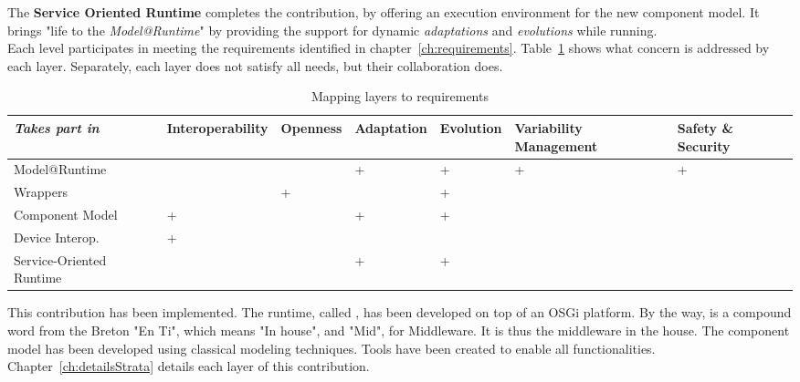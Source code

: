 The {\bf Service Oriented Runtime} completes the contribution, by offering an execution environment for the new component model. It brings "life to the {\it Model@Runtime}" by providing the support for dynamic {\it adaptations} and {\it evolutions} while running.\\

Each level participates in meeting the requirements identified in chapter~\ref{ch:requirements}. Table~\ref{table:layer_req} shows what concern is addressed by each layer. Separately, each layer does not satisfy all needs, but their collaboration does.\\

\begin{table}[h!]
\begin{tabular}{m{}| >{\centering\arraybackslash}m{}| >{\centering\arraybackslash}m{}| >{\centering\arraybackslash}m{}| >{\centering\arraybackslash}m{}| >{\centering}m{}| >{\centering\arraybackslash}m{}|}
 {\it Takes part in}& {\tiny Interoperability} & {\tiny Openness} & {\tiny Adaptation} & {\tiny Evolution} & {\tiny Variability Management} & {\tiny Safety \& Security}\\
 \hline\hline
 {\small Model@Runtime} & & & + & + & + & + \\
  \hline
 {\small Wrappers} & & + &  & + &  & \\
  \hline
 {\small Component Model} & + & & + & + & & \\
  \hline
 {\small Device Interop.} & + & & & & & \\
  \hline
 {\small Service-Oriented Runtime} & & & + & + & &\\
 \hline
\end{tabular}
 \caption{Mapping layers to requirements}
 \label{table:layer_req}
\end{table}


\par This contribution has been implemented. The runtime, called \enti{}, has been developed on top of an OSGi platform. By the way, \enti{} is a compound word from the Breton "En Ti", which means "In house", and "Mid", for Middleware. It is thus the middleware in the house. The component model has been developed using classical modeling techniques. Tools have been created to enable all functionalities.\\
Chapter~\ref{ch:detailsStrata} details each layer of this contribution.


